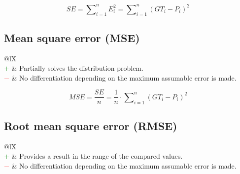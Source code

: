 \documentclass{article}
\begin{document}
\begin{equation}
    \textit{SE} = \sum\nolimits_{i = 1}^n E_i^2 = \sum\nolimits_{i = 1}^n (\textit{GT}_i - P_i)^2
%
    \label{equation:SE}
\end{equation}


\subsection[Mean square error (MSE)]{Mean square error (MSE) \cite{bickel2015mathematical}}

\begin{table}[H]\centering
    \begin{tabularx}{\textwidth}{@{}lX}
        \multicolumn{2}{@{}X}{Calculates the mean of the sum (total) of all squared errors. (range: $[0, \infty)$)} \\
        \textcolor{Green}{$+$} & Partially solves the distribution problem. \\
        \textcolor{Red}{$-$}   & No differentiation depending on the maximum assumable error is made.
    \end{tabularx}
\end{table}

\begin{equation}
    \textit{MSE} = \dfrac{\textit{SE}}{n} = \dfrac{1}{n} \cdot \sum\nolimits_{i = 1}^n (\textit{GT}_i - P_i)^2
%
    \label{equation:MSE}
\end{equation}


\subsection[Root mean square error (RMSE)]{Root mean square error (RMSE) \cite{willmott2005advantages, hyndman2006another, pontius2008components}}

\begin{table}[H]\centering
    \begin{tabularx}{\textwidth}{@{}lX}
        \multicolumn{2}{@{}X}{Calculates the root of the mean of the sum (total) of all squared errors. (range: $[0, \infty)$)} \\
        \textcolor{Green}{$+$} & Provides a result in the range of the compared values. \\
        \textcolor{Red}{$-$}   & No differentiation depending on the maximum assumable error is made.
    \end{tabularx}
\end{table}
\end{document}
